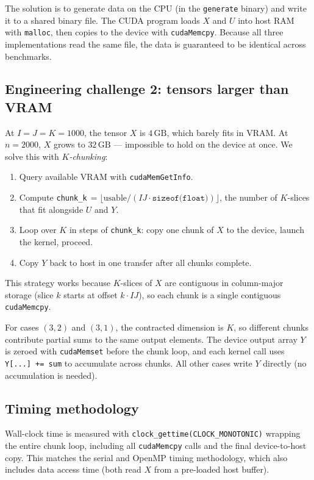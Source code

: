 \documentclass[11pt]{article}
\begin{document}
The solution is to generate data on the CPU (in the \texttt{generate}
binary) and write it to a shared binary file.  The CUDA program loads $X$
and $U$ into host RAM with \texttt{malloc}, then copies to the device
with \texttt{cudaMemcpy}.  Because all three implementations read the
same file, the data is guaranteed to be identical across benchmarks.

\subsection{Engineering challenge 2: tensors larger than VRAM}
\label{sec:kchunk}

At $I{=}J{=}K{=}1000$, the tensor $X$ is $4\,\text{GB}$, which barely
fits in VRAM.  At $n{=}2000$, $X$ grows to $32\,\text{GB}$ --- impossible
to hold on the device at once.  We solve this with \emph{$K$-chunking}:

\begin{enumerate}
  \item Query available VRAM with \texttt{cudaMemGetInfo}.
  \item Compute \texttt{chunk\_k}\,$ = \lfloor\text{usable} / (IJ \cdot \texttt{sizeof(float)})\rfloor$,
        the number of $K$-slices that fit alongside $U$ and $Y$.
  \item Loop over $K$ in steps of \texttt{chunk\_k}: copy one chunk of
        $X$ to the device, launch the kernel, proceed.
  \item Copy $Y$ back to host in one transfer after all chunks complete.
\end{enumerate}

This strategy works because $K$-slices of $X$ are contiguous in
column-major storage (slice $k$ starts at offset $k \cdot IJ$), so each
chunk is a single contiguous \texttt{cudaMemcpy}.

For cases $(3,2)$ and $(3,1)$, the contracted dimension is $K$, so
different chunks contribute partial sums to the same output elements.
The device output array $Y$ is zeroed with \texttt{cudaMemset} before
the chunk loop, and each kernel call uses \texttt{Y[...] += sum} to
accumulate across chunks.  All other cases write $Y$ directly (no
accumulation is needed).

\subsection{Timing methodology}

Wall-clock time is measured with \texttt{clock\_gettime(CLOCK\_MONOTONIC)}
wrapping the entire chunk loop, including all \texttt{cudaMemcpy} calls
and the final device-to-host copy.  This matches the serial and OpenMP
timing methodology, which also includes data access time (both read $X$
from a pre-loaded host buffer).
\end{document}
